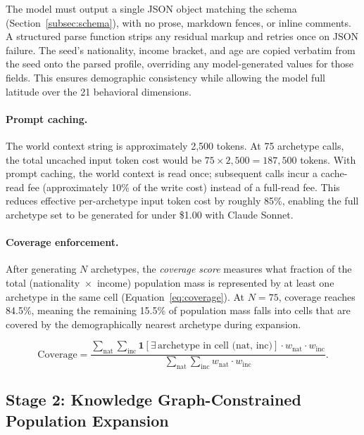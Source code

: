 \documentclass[a4paper,12pt]{article}
\begin{document}
The model must output a single JSON object matching the schema
(Section~\ref{subsec:schema}), with no prose, markdown fences, or inline
comments. A structured parse function strips any residual markup and
retries once on JSON failure. The seed's nationality, income bracket, and
age are copied verbatim from the seed onto the parsed profile, overriding
any model-generated values for those fields. This ensures demographic
consistency while allowing the model full latitude over the 21 behavioral
dimensions.

\paragraph{Prompt caching.}
The world context string is approximately 2,500 tokens. At 75 archetype
calls, the total uncached input token cost would be $75 \times 2{,}500
= 187{,}500$ tokens. With prompt caching, the world context is read once;
subsequent calls incur a cache-read fee (approximately 10\% of the write
cost) instead of a full-read fee. This reduces effective per-archetype
input token cost by roughly 85\%, enabling the full archetype set to be
generated for under \$1.00 with Claude Sonnet.

\paragraph{Coverage enforcement.}
After generating $N$ archetypes, the \emph{coverage score} measures what
fraction of the total (nationality~$\times$~income) population mass is
represented by at least one archetype in the same cell
(Equation~\eqref{eq:coverage}). At $N = 75$, coverage reaches 84.5\%,
meaning the remaining 15.5\% of population mass falls into cells that
are covered by the demographically nearest archetype during expansion.

\begin{equation}
  \text{Coverage} =
    \frac{\displaystyle\sum_{\text{nat}} \sum_{\text{inc}}
           \mathbf{1}[\exists\,\text{archetype in cell (nat, inc)}]
           \cdot w_\text{nat} \cdot w_\text{inc}}
         {\displaystyle\sum_{\text{nat}} \sum_{\text{inc}}
           w_\text{nat} \cdot w_\text{inc}}.
  \label{eq:coverage}
\end{equation}

\subsection{Stage 2: Knowledge Graph-Constrained Population Expansion}
\label{subsec:expansion}
\end{document}
